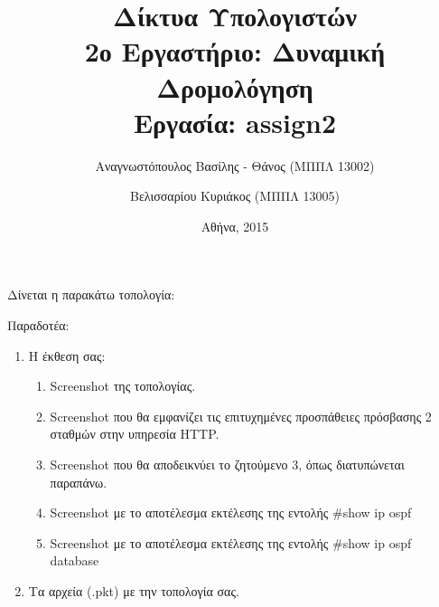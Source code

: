 \documentclass{assignment}
\title{Δίκτυα Υπολογιστών \\ 2ο Εργαστήριο: Δυναμική Δρομολόγηση \\ Εργασία: assign2}
\date{Αθήνα, 2015}
\author{Αναγνωστόπουλος Βασίλης - Θάνος (ΜΠΠΛ 13002) \and Βελισσαρίου Κυριάκος (ΜΠΠΛ 13005)}
\begin{document}
\maketitle

\setcounter{page}{1} 

\pagestyle{plain}
\tableofcontents
\listoftables
\listoffigures
\newpage

\setcounter{page}{1} 


Δίνεται η παρακάτω τοπολογία:

\begin{center}
\end{center}
 
Παραδοτέα:

\begin{enumerate}
  \item Η έκθεση σας:
  \begin{enumerate}
     \item Screenshot της τοπολογίας.
     \item Screenshot που θα εμφανίζει τις επιτυχημένες προσπάθειες πρόσβασης 2 σταθμών στην υπηρεσία HTTP.
     \item Screenshot που θα αποδεικνύει το ζητούμενο 3, όπως διατυπώνεται παραπάνω.
     \item Screenshot με το αποτέλεσμα εκτέλεσης της εντολής \#show ip ospf
     \item Screenshot με το αποτέλεσμα εκτέλεσης της εντολής \#show ip ospf database
  \end{enumerate}
  \item Τα αρχεία (.pkt) με την τοπολογία σας.
\end{enumerate}
\end{document}
